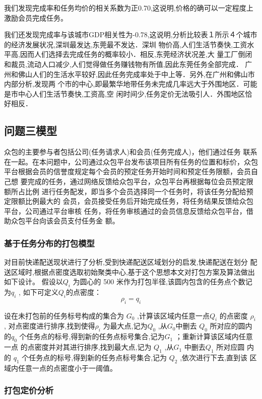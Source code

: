 \documentclass{cumcmthesis}
\begin{document}
我们发现完成率和任务均价的相关系数为正0.70,这说明,价格的确可以一定程度上激励会员完成任务。

我们还发现完成率与该城市GDP相关性为-0.78,这说明,分析比较表１所示４个城市的经济发展状况,深圳最发达,东莞最不发达．深圳 物价高,人们生活节奏快,工资水平高,因而人们选择去完成任务的概率较小．相反,东莞经济状况差,大 量工厂倒闭和裁员,流动人口减少,人们觉得做任务赚钱物有所值,因此东莞任务全部完成． 广州和佛山人们的生活水平较好,因此任务完成率处于中上等．另外,在广州和佛山市内部分析,发现两 个市的中心,即最繁华地带任务未完成几率远大于外围地区．可能是市中心人们生活节奏快,工资高,空 闲时间少,任务定价无法吸引人．外围地区恰好相反．


 
\subsection{问题三模型}
众包的主要参与者包括公司(任务请求人)和会员(任务完成人)，他们通过任务 联系在一起。在本问题中，公司通过众包平台发布该项目所有任务的位置和标价，众包 平台根据会员的信誉度规定每个会员的预定任务开始时间和预定任务限额，会员自己想 要完成的任务，通过网络反馈给众包平台，众包平台再根据每位会员预定限额所占比例 进行任务配发，即当多个会员选择同一个任务时，将该任务分配给预定限额比例最大的 会员，会员接受任务后开始完成任务，将任务结果反馈给众包平台，公司通过平台审核 任务，将任务审核通过的会员信息反馈给众包平台，借助众包平台向该会员支付任务金 额。
\subsubsection{基于任务分布的打包模型}

对目前快递配送现状进行了分析,受到快递配送区域划分的启发,快递配送在划分 配送区域时,根据点密度选取初始聚类中心,基于这个思想本文对打包方案及算法做出 如下设计。
假设以$Q_i$ 为圆心的 500 米作为打包半径,该圆内包含的任务点个数记为$q_i$ , 如下可定义$Q_i$的点密度：
\[ \rho_i=q_i \]

设在未打包前的任务标号构成的集合为 $G_0$ ,计算该区域内任意一点$Q_i$ 的点密度 $\rho_i$ 
, 对点密度进行排序,找到使得$\rho_i$ 为最大点,记为$Q_0$ ,从$G_0$中删去 $Q_0$ 所对应的圆内 的$q_0$ 个任务点的标号,得到新的任务点标号集合,记为$G_1$ ；重新计算该区域内任意一点 的点密度并对其进行排序,找到最大点,记为 $Q_1$ ,从$G_1$ 中删去$Q_1$ 所对应圆 内的 $q_1$ 个任务点的标号,得到新的任务点标号集合,记为 $Q_2$ ,依次进行下去,直到该 区域内任意一点的点密度小于一阈值。

\subsubsection{打包定价分析}
\end{document}
